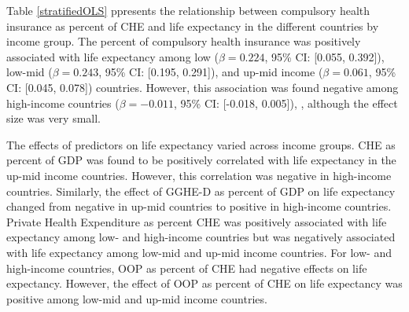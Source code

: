 \documentclass[]{elsarticle} %
\begin{document}
Table \ref{stratifiedOLS} ppresents the relationship between compulsory health insurance as percent of CHE and life expectancy in the different countries by income group. The percent of compulsory health insurance was positively associated with life expectancy among low (\(\beta = 0.224\), 95\% CI: {[}0.055, 0.392{]}), low-mid (\(\beta = 0.243\), 95\% CI: {[}0.195, 0.291{]}), and up-mid income (\(\beta = 0.061\), 95\% CI: {[}0.045, 0.078{]}) countries. However, this association was found negative among high-income countries (\(\beta = -0.011\), 95\% CI: {[}-0.018, 0.005{]}), , although the effect size was very small.

The effects of predictors on life expectancy varied across income groups. CHE as percent of GDP was found to be positively correlated with life expectancy in the up-mid income countries. However, this correlation was negative in high-income countries. Similarly, the effect of GGHE-D as percent of GDP on life expectancy changed from negative in up-mid countries to positive in high-income countries. Private Health Expenditure as percent CHE was positively associated with life expectancy among low- and high-income countries but was negatively associated with life expectancy among low-mid and up-mid income countries. For low- and high-income countries, OOP as percent of CHE had negative effects on life expectancy. However, the effect of OOP as percent of CHE on life expectancy was positive among low-mid and up-mid income countries.
\end{document}
